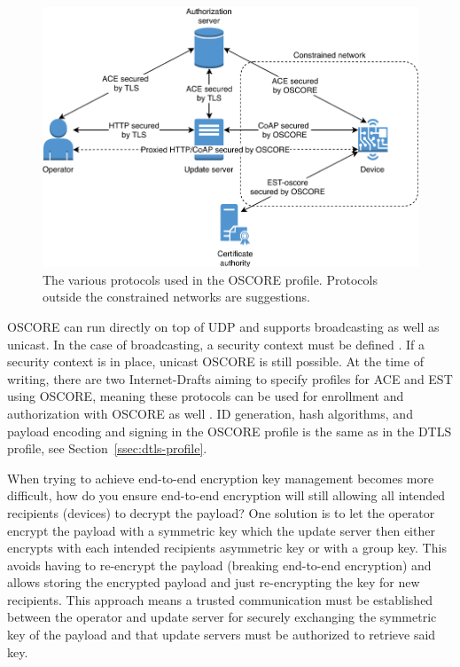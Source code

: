 \documentclass[0-thesis.tex]{subfiles}
\begin{document}
\begin{figure}
    \caption{The various protocols used in the OSCORE profile. Protocols outside the constrained networks are suggestions.}
    \label{fig:oscore-profile}
    \includegraphics{images/oscore-profile.pdf}
\end{figure}

OSCORE can run directly on top of UDP and supports broadcasting as well as unicast. In the
case of broadcasting, a security context must be defined \parencite{oscore-group}. If a
security context is in place, unicast OSCORE is still possible. At the time of writing,
there are two Internet-Drafts aiming to specify profiles for ACE and EST using OSCORE,
meaning these protocols can be used for enrollment and authorization with OSCORE as well
\parencite{ace-oscore, est-oscore}. ID generation, hash algorithms, and payload encoding
and signing in the OSCORE profile is the same as in the DTLS profile, see
Section~\ref{ssec:dtls-profile}.

When trying to achieve end-to-end encryption key management becomes more difficult, how do
you ensure end-to-end encryption will still allowing all intended recipients (devices) to
decrypt the payload? One solution is to let the operator  encrypt the payload with a
symmetric key which the update server then either encrypts with each intended recipients
asymmetric key or with a group key. This avoids having to re-encrypt the payload (breaking
end-to-end encryption) and allows storing the encrypted payload and just re-encrypting the
key for new recipients. This approach means a trusted communication must be established
between the operator and update server for securely exchanging the symmetric key of the
payload and that update servers must be authorized to retrieve said key.
\end{document}
